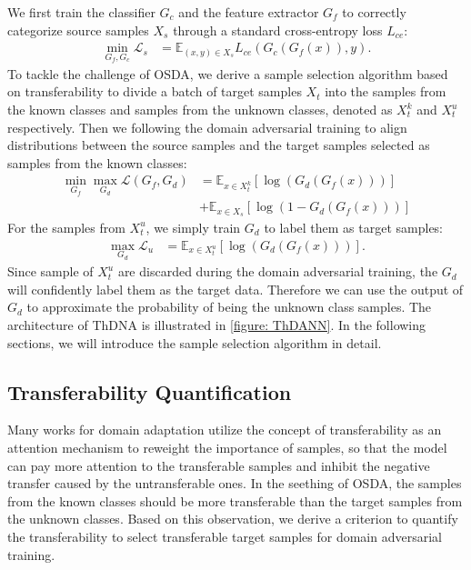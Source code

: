 We first train the classifier $G_c$ and the feature extractor $G_f$ to correctly categorize source samples $X_s$ through a standard cross-entropy loss $L_{ce}$:
\begin{equation}
    \label{eq: training ThDAN class}
    \begin{split}
        \min_{G_f,G_c} \mathscr{L}_s 
        &= \mathbb{E}_{(x,y) \in X_s} L_{ce}\left(G_c\left(G_f\left(x\right)\right), y\right).
    \end{split}
\end{equation}
To tackle the challenge of OSDA, we derive a sample selection algorithm based on transferability to divide a batch of target samples $X_t$ into the samples from the known classes and samples from the unknown classes, denoted as $X_t^k$ and $X_t^u$ respectively. 
Then we following the domain adversarial training to align distributions between the source samples and the target samples selected as samples from the known classes: 
\begin{equation}
    \label{eq: training ThDAN known}
    \begin{split}
        \min_{G_f} \max_{G_d} \mathscr{L}(G_f,G_d) &=\mathbb{E}_{x\in X_t^k} \left[ \log \left(G_d\left(G_f\left(x\right)\right)\right) \right]\\
        &+\mathbb{E}_{x \in X_s}\left[ \log \left(1-G_d\left(G_f\left(x\right)\right)\right) \right]
    \end{split}
\end{equation}
For the samples from $X_t^u$, we simply train $G_d$ to label them as target samples:
\begin{equation}
    \label{eq: ttraining ThDAN unknown}
    \begin{split}
        \max_{G_d} \mathscr{L}_u &=\mathbb{E}_{x\in X_t^u} \left[ \log \left(G_d\left(G_f\left(x\right)\right)\right) \right].
    \end{split}
\end{equation}
Since sample of $X_t^u$ are discarded during the domain adversarial training, the $G_d$ will confidently label them as the target data.
Therefore we can use the output of $G_d$ to approximate the probability of being the unknown class samples.
The architecture of ThDNA is illustrated in \figurename{\ref{figure: ThDANN}}.
In the following sections, we will introduce the sample selection algorithm in detail.

\subsection{Transferability Quantification}
Many works for domain adaptation \cite{PartialDA-iw,TransferableAttentionDA,PartialDA-tf} utilize the concept of transferability as an attention mechanism to reweight the importance of samples, so that the model can pay more attention to the transferable samples and inhibit the negative transfer caused by the untransferable ones. 
In the seething of OSDA, the samples from the known classes should be more transferable than the target samples from the unknown classes.
Based on this observation, we derive a criterion to quantify the transferability to select transferable target samples for domain adversarial training.

